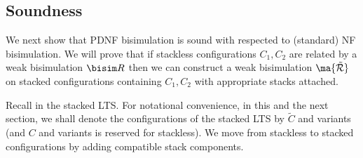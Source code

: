 



\subsection{Soundness}\label{sec:soundness}

\newcommand\toS[1]{\widetilde{(#1)}}
\newcommand\tC{\tilde{C}}
\newcommand{\tsR}{\ma{\mathrel{\tilde{\mathcal{R}}}}}
\newcommand{\tR}{\ma{\tilde{\mathcal{R}}}}

We next show that PDNF bisimulation is sound with respected to (standard) NF bisimulation. We will prove that if stackless configurations $C_1,C_2$ are related by a weak bisimulation $\bisim R$ then we can construct a weak bisimulation $\tR$ on stacked configurations containing $C_1,C_2$ with appropriate stacks attached.

Recall in  the {stacked} LTS.
For notational convenience,
in this and the next section, 
we shall denote the configurations of the stacked LTS by $\tilde C$ and variants (and $C$ and variants is reserved for stackless). We move from stackless to stacked configurations by adding compatible stack components.

